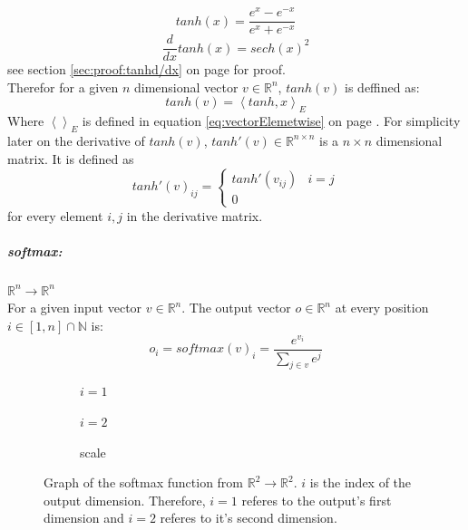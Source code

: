 \documentclass[12pt]{article}
\newcommand{\equationref}[1]{equation \ref{#1} on page \pageref{#1}}
\newcommand{\sectionref}[1]{section \ref{#1} on page \pageref{#1}}
\begin{document}
\begin{center}

\end{center}

\begin{equation} \label{eq:NN:tanh}
tanh(x) = \frac{e^x-e^{-x}}{e^x+e^{-x}}
\end{equation}\begin{equation} \label{eq:NN:tanh_derivative}
\frac{d}{dx}tanh(x) = sech(x)^2
\end{equation}
see \sectionref{sec:proof:tanhd/dx} for proof.\\
Therefor for a given \(n\) dimensional vector \(v \in \mathbb R^n\), \(tanh(v)\) is deffined as:
\begin{equation}\label{eq:vecTanh}
tanh(v) = \left<tanh, x\right>_E
\end{equation}
Where \(\left<\right>_E\) is defined in \equationref{eq:vectorElemetwise}. For simplicity later on the derivative of \(tanh(v)\), \(tanh'(v) \in \mathbb R^{n \times n}\) is a \(n \times n\) dimensional matrix. It is defined as
\begin{equation}
tanh'(v)_{ij} = \left\{\begin{matrix}
tanh'(v_{ij}) & i = j \\
0
\end{matrix}\right.
\end{equation}
for every element \(i,j\) in the derivative matrix.

\subparagraph*{softmax:} \(\mathbb{R}^n\to \mathbb{R}^n\)\\
\indent For a given input vector \(v \in \mathbb{R}^n\). The output vector \(o \in \mathbb{R}^n\) at every position \(i \in [1, n]\cap\mathbb N\) is:
\begin{equation} \label{eq:NN:softmax}
o_i = softmax(v)_i = \frac{e^{v_i}}{\sum_{j \in v} e^j}
\end{equation}
\begin{figure}[H]
\centering
\begin{subfigure}{.4\textwidth}
  \centering
  
  \caption{\(i=1\)}
  \label{fig:sub1}
\end{subfigure}%
\begin{subfigure}{.4\textwidth}
  \centering
  
  \caption{\(i=2\)}
  \label{fig:sub2}
\end{subfigure}
\begin{subfigure}{.1\textwidth}
  \centering
  
  \caption*{scale}
\end{subfigure}
\caption{Graph of the softmax function from \(\mathbb R^2 \to \mathbb R^2\). \(i\) is the index of the output dimension. Therefore, \(i=1\) referes to the output's first dimension and \(i=2\) referes to it's second dimension.}
\label{fig:test}
\end{figure}
\end{document}
